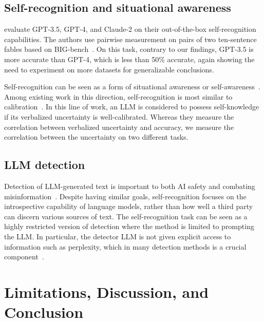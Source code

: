 \documentclass{article}
\theoremstyle{plain}
\theoremstyle{definition}
\theoremstyle{remark}
\begin{document}

\subsection{Self-recognition and situational awareness}
\citet{hoelscher-obermaierTuringMirrorEvaluatingAbility2023} evaluate GPT-3.5, GPT-4, and Claude-2 on their out-of-the-box self-recognition capabilities.
The authors use pairwise measurement on pairs of two ten-sentence fables based on BIG-bench~\citep{srivastavaImitationGameQuantifying2023}.
On this task, contrary to our findings, GPT-3.5 is more accurate than GPT-4, which is less than 50\% accurate, again showing the need to experiment on more datasets for generalizable conclusions.

Self-recognition can be seen as a form of situational awareness or self-awareness~\citep{laine2023towards,wang2024mm,berglund2023taken,perezEvaluatingAISystems2023a}.
Among existing work in this direction, self-recognition is most similar to calibration~\citep{kadavath2022language,yin2023large,amayuelas2023knowledge}.
In this line of work, an LLM is considered to possess self-knowledge if its verbalized uncertainty is well-calibrated.
Whereas they measure the correlation between verbalized uncertainty and accuracy, we measure the correlation between the uncertainty on two different tasks.

\subsection{LLM detection}

Detection of LLM-generated text is important to both AI safety and combating misinformation~\citep{jawahar2020automatic,crothers2023machine,wu2023survey,yang2023survey,kumarage2024survey}.
Despite having similar goals, self-recognition focuses on the introspective capability of language models, rather than how well a third party can discern various sources of text.
The self-recognition task can be seen as a highly restricted version of detection where the method is limited to prompting the LLM.
In particular, the detector LLM is not given explicit access to information such as perplexity, which in many detection methods is a crucial component~\citep{mitchell2023detectgpt,hans2024spotting}.


\section{Limitations, Discussion, and Conclusion}
\label{sec:discussion}
\end{document}

